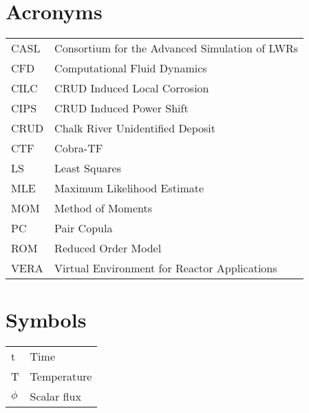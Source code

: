 
\section*{Acronyms}
\begin{tabular}{l l}
CASL & Consortium for the Advanced Simulation of LWRs \\
CFD &  Computational Fluid Dynamics \\
CILC & CRUD Induced Local Corrosion \\
CIPS & CRUD Induced Power Shift \\
CRUD & Chalk River Unidentified Deposit \\
CTF &  Cobra-TF \\
LS  &  Least Squares \\
MLE &  Maximum Likelihood Estimate \\
MOM &  Method of Moments \\
PC  &  Pair Copula \\
ROM &  Reduced Order Model \\
VERA & Virtual Environment for Reactor Applications \\
\end{tabular}

\section*{Symbols}
\begin{tabular}{l l}
t & Time \\
T & Temperature \\
$\phi$ & Scalar flux \\
\end{tabular}

\pagebreak
